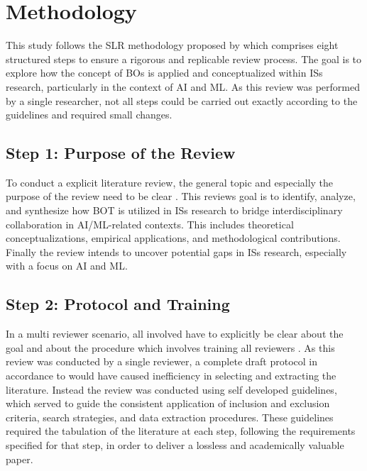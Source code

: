 \documentclass[12pt,oneside]{article}
\begin{document}
\section{Methodology} \label{methodology}

This study follows the \ac{SLR} methodology proposed by \citet[43-44]{okoli2015guide} which comprises eight structured steps to ensure a rigorous and replicable review process. The goal is to explore how the concept of \ac{BO}s is applied and conceptualized within \ac{IS}s research, particularly in the context of \ac{AI} and \ac{ML}. As this review was performed by a single researcher, not all steps could be carried out exactly according to the guidelines and required small changes.

\subsection{Step 1: Purpose of the Review}
To conduct a explicit literature review, the general topic and especially the purpose of the review need to be clear \citep[887]{okoli2015guide}. This reviews goal is to identify, analyze, and synthesize how \ac{BOT} is utilized in \ac{IS}s research to bridge interdisciplinary collaboration in \ac{AI}/\ac{ML}-related contexts. This includes theoretical conceptualizations, empirical applications, and methodological contributions. Finally the review intends to uncover potential gaps in \ac{IS}s research, especially with a focus on \ac{AI} and \ac{ML}.

\subsection{Step 2: Protocol and Training}

In a multi reviewer scenario, all involved have to explicitly be clear about the goal and about the procedure which involves training all reviewers \citep[889-891]{okoli2015guide}. As this review was conducted by a single reviewer, a complete draft protocol in accordance to \citet[889-891]{okoli2015guide} would have caused inefficiency in selecting and extracting the literature. Instead the review was conducted using self developed guidelines, which served to guide the consistent application of inclusion and exclusion criteria, search strategies, and data extraction procedures. These guidelines required the tabulation of the literature at each step, following the requirements specified for that step, in order to deliver a lossless and academically valuable paper.
\end{document}
